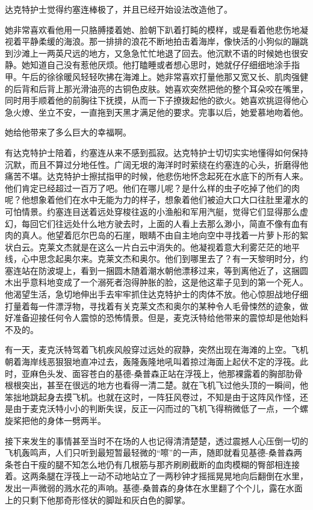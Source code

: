     达克特护士觉得约塞连棒极了，并且已经开始设法改造他了。

    她非常喜欢看他用一只胳膊搂着她、脸朝下趴着打盹的模样，或是看着他悲伤地凝视着平静柔缓的海浪。那一排排的浪花不断地拍击着海岸，像快活的小狗似的蹦跳到沙滩上一两英尺远的地方，又急急忙忙地退了回去。他沉默不语的时候她也很安静。她知道自己没有惹他厌烦。他打瞌睡或者想心思时，她就仔仔细细地涂手指甲。午后的徐徐暖风轻轻吹拂在海滩上。她非常喜欢打量他那又宽又长、肌肉强健的后背和后背上那光滑油亮的古铜色皮肤。她喜欢突然把他的整个耳朵咬在嘴里，同时用手顺着他的前胸往下抚摸，从而一下子撩拨起他的欲火。她喜欢挑逗得他心急火燎、坐立不安，一直拖到天黑才满足他的要求。完事以后，她爱慕地吻着他。

    她给他带来了多么巨大的幸福啊。

    有达克特护士陪着，约塞连从来不感到孤寂。达克特护士切切实实地懂得如何保持沉默，而且不算过分地任性。广阔无垠的海洋时时萦绕在约塞连的心头，折磨得他痛苦不堪。达克特护士擦拭指甲的时候，他悲伤地怀念起死在水底下的所有人来。他们肯定已经超过一百万了吧。他们在哪儿呢？是什么样的虫子吃掉了他们的肉呢？他想象着他们在水中无能为力的样子，想象着他们被迫大口大口往肚里灌水的可怕情景。约塞连目送着远处穿梭往返的小渔船和军用汽艇，觉得它们显得那么虚幻，每回它们往远处什么地方驶去时，上面的人看上去那么渺小，简直不像有血有肉的真人。他望着厄尔巴岛的石崖，眼睛不由自主地向空中寻找着一片萝卜形的絮状白云。克莱文杰就是在这么一片白云中消失的。他凝视着意大利雾茫茫的地平线，心中思念起奥尔来。克莱文杰和奥尔。他们到哪里去了？有一天黎明时分，约塞连站在防波堤上，看到一捆圆木随着潮水朝他漂移过来，等到离他近了，这捆圆木出乎意料地变成了一个溺死者泡得肿胀的脸，这是他这辈子见到的第一个死人。他渴望生活，急切地伸出手去牢牢抓住达克特护士的肉体不放。他心惊胆战地仔细打量着每一件漂浮物，寻找着有关克莱文杰和奥尔的某种令人毛骨悚然的迹象，做好准备迎接任何令人震惊的恐怖情景。但是，麦克沃特给他带来的震惊却是他始料不及的。

    有一天，麦克沃特驾着飞机疾风般穿过远处的寂静，突然出现在海滩的上空。飞机朝着海岸线恶狠狠地直冲过去，轰隆轰隆地吼叫着掠过海面上起伏不定的浮筏。此时，亚麻色头发、面容苍白的基德-桑普森正站在浮筏上，他那裸露着的胸部肋骨根根突出，甚至在很远的地方也看得一清二楚。就在飞机飞过他头顶的一瞬间，他笨拙地跳起身去摸飞机。也就在这时，一阵狂风卷过，不知是由于这阵风作怪，还是由于麦克沃特小小的判断失误，反正一闪而过的飞机飞得稍微低了一点，一个螺旋桨把他的身体一劈两半。
 


    接下来发生的事情甚至当时不在场的人也记得清清楚楚，透过震撼人心压倒一切的飞机轰鸣声，人们只听到最短暂最轻微的“嚓”的一声，随即就看见基德-桑普森两条苍白干瘦的腿不知怎么地仍有几根筋与那齐刷刷截断的血肉模糊的臀部相连接着。这两条腿在浮筏上一动不动地站立了一两秒钟才摇摇晃晃地向后翻倒在水里，发出一声微弱的溅水花的声响。基德-桑普森的身体在水里翻了个个儿，露在水面上的只剩下他那奇形怪状的脚趾和灰白色的脚掌。

